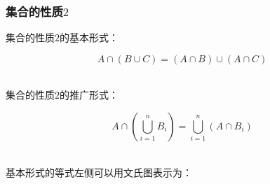 \documentclass[UTF8]{ctexart}
\begin{document}
\subsubsection{集合的性质$2$}
    集合的性质$2$的基本形式：
    \begin{large}
        \begin{equation*}
            A\cap(B\cup C)=(A\cap B)\cup(A\cap C)
        \end{equation*}
    \end{large}\\
    集合的性质$2$的推广形式：
    \begin{large}
        \begin{equation*}
            A\cap\left(\bigcup_{i=1}^n B_i\right)=\bigcup_{i=1}^n(A\cap B_i)
        \end{equation*}
    \end{large}\\[1mm]
    基本形式的等式左侧可以用文氏图表示为：\vspace{5pt}
\end{document}
